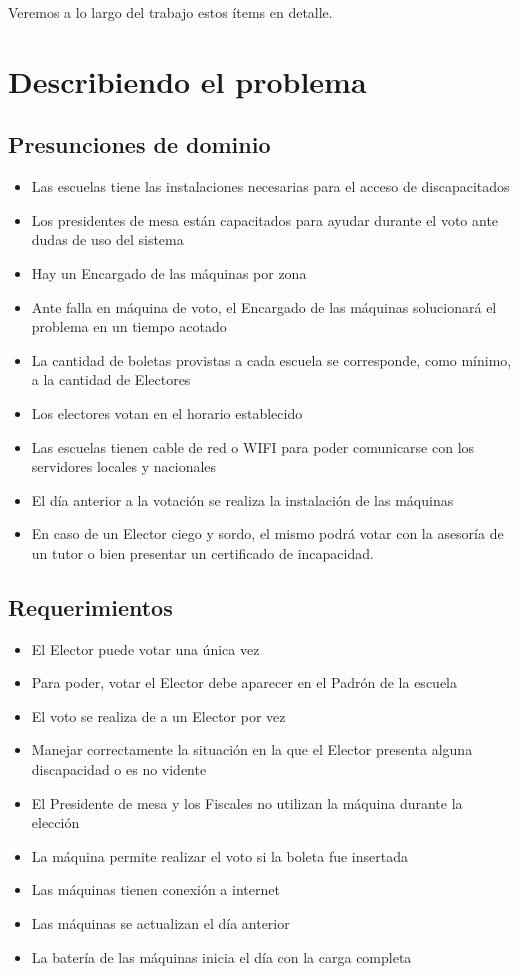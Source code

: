 \documentclass[spanish, 10pt,a4paper]{article}
\numberwithin{equation}{section} %
\begin{document}
	Veremos a lo largo del trabajo estos ítems en detalle.
	
\newpage
\section{Describiendo el problema}

\subsection{Presunciones de dominio}
\begin{itemize}
\item Las escuelas tiene las instalaciones necesarias para el acceso de discapacitados
\item Los presidentes de mesa están capacitados para ayudar durante el voto ante dudas de uso del sistema
\item Hay un Encargado de las máquinas por zona
\item Ante falla en máquina de voto, el Encargado de las máquinas solucionará el problema en un tiempo acotado
\item La cantidad de boletas provistas a cada escuela se corresponde, como mínimo, a la cantidad de Electores
\item Los electores votan en el horario establecido
\item Las escuelas tienen cable de red o WIFI para poder comunicarse con los servidores locales y nacionales
\item El día anterior a la votación se realiza la instalación de las máquinas 
\item En caso de un Elector ciego y sordo, el mismo podrá votar con la asesoría de un tutor o bien presentar un certificado de incapacidad.
\end{itemize}

\subsection{Requerimientos}
\begin{itemize}
\item El Elector puede votar una única vez
\item Para poder, votar el Elector debe aparecer en el Padrón de la escuela
\item El voto se realiza de a un Elector por vez
\item Manejar correctamente la situación en la que el Elector presenta alguna discapacidad o es no vidente
\item El Presidente de mesa y los Fiscales no utilizan la máquina durante la elección
\item La máquina permite realizar el voto si la boleta fue insertada
\item Las máquinas tienen conexión a internet
\item Las máquinas se actualizan el día anterior
\item La batería de las máquinas inicia el día con la carga completa
\end{itemize}
\end{document}
